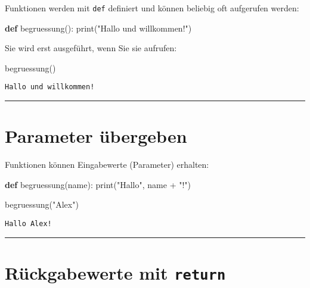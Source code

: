 \documentclass[
  letterpaper,
  DIV=11,
  numbers=noendperiod]{scrreprt}
\newenvironment{Shaded}{\begin{snugshade}}{\end{snugshade}}
\newcommand{\BuiltInTok}[1]{\textcolor[rgb]{0.00,0.23,0.31}{#1}}
\newcommand{\KeywordTok}[1]{\textcolor[rgb]{0.00,0.23,0.31}{\textbf{#1}}}
\newcommand{\NormalTok}[1]{\textcolor[rgb]{0.00,0.23,0.31}{#1}}
\newcommand{\OperatorTok}[1]{\textcolor[rgb]{0.37,0.37,0.37}{#1}}
\newcommand{\StringTok}[1]{\textcolor[rgb]{0.13,0.47,0.30}{#1}}
\begin{document}
\begin{tcolorbox}
Funktionen werden mit \texttt{def} definiert und können beliebig oft
aufgerufen werden:

\begin{Shaded}
\begin{Highlighting}[]
\KeywordTok{def}\NormalTok{ begruessung():}
    \BuiltInTok{print}\NormalTok{(}\StringTok{"Hallo und willkommen!"}\NormalTok{)}
\end{Highlighting}
\end{Shaded}

Sie wird erst ausgeführt, wenn Sie sie aufrufen:

\begin{Shaded}
\begin{Highlighting}[]
\NormalTok{begruessung()}
\end{Highlighting}
\end{Shaded}

\begin{verbatim}
Hallo und willkommen!
\end{verbatim}

\begin{center}\rule{0.5\linewidth}{0.5pt}\end{center}

\section{Parameter übergeben}\label{parameter-uxfcbergeben}

Funktionen können Eingabewerte (Parameter) erhalten:

\begin{Shaded}
\begin{Highlighting}[]
\KeywordTok{def}\NormalTok{ begruessung(name):}
    \BuiltInTok{print}\NormalTok{(}\StringTok{"Hallo"}\NormalTok{, name }\OperatorTok{+} \StringTok{"!"}\NormalTok{)}

\NormalTok{begruessung(}\StringTok{"Alex"}\NormalTok{)}
\end{Highlighting}
\end{Shaded}

\begin{verbatim}
Hallo Alex!
\end{verbatim}

\begin{center}\rule{0.5\linewidth}{0.5pt}\end{center}

\section{\texorpdfstring{Rückgabewerte mit
\texttt{return}}{Rückgabewerte mit return}}\label{ruxfcckgabewerte-mit-return}


\end{tcolorbox}
\end{document}
